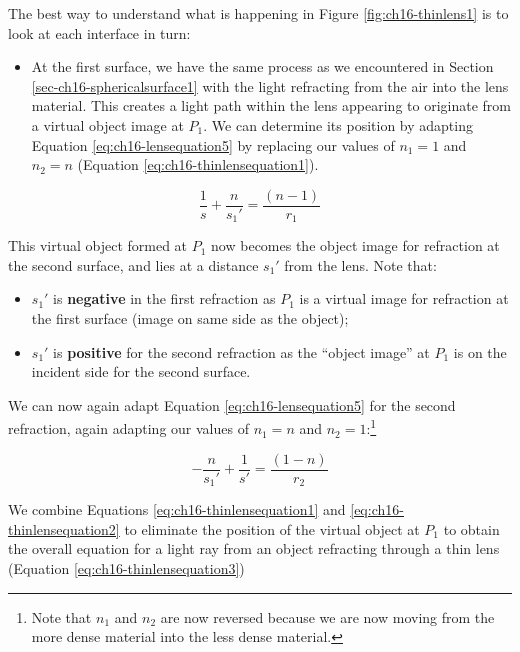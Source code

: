 \documentclass[
]{book}
\providecommand{\tightlist}{%
  \setlength{\itemsep}{0pt}\setlength{\parskip}{0pt}}
\begin{document}
The best way to understand what is happening in Figure \ref{fig:ch16-thinlens1} is to look at each interface in turn:

\begin{itemize}
\tightlist
\item
  At the first surface, we have the same process as we encountered in Section \ref{sec-ch16-sphericalsurface1} with the light refracting from the air into the lens material. This creates a light path within the lens appearing to originate from a virtual object image at \(P_1\). We can determine its position by adapting Equation \eqref{eq:ch16-lensequation5} by replacing our values of \(n_1 = 1\) and \(n_2 = n\) (Equation \eqref{eq:ch16-thinlensequation1}).
\end{itemize}

\begin{equation}
\frac{1}{s} + \frac{n}{s_1'} = \frac{(n - 1)}{r_1}
\label{eq:ch16-thinlensequation1}
\end{equation}

This virtual object formed at \(P_1\) now becomes the object image for refraction at the second surface, and lies at a distance \(s_1'\) from the lens. Note that:

\begin{itemize}
\tightlist
\item
  \(s_1'\) is \textbf{negative} in the first refraction as \(P_1\) is a virtual image for refraction at the first surface (image on same side as the object);
\item
  \(s_1'\) is \textbf{positive} for the second refraction as the ``object image'' at \(P_1\) is on the incident side for the second surface.
\end{itemize}

We can now again adapt Equation \eqref{eq:ch16-lensequation5} for the second refraction, again adapting our values of \(n_1 = n\) and \(n_2 = 1\):\footnote{Note that \(n_1\) and \(n_2\) are now reversed because we are now moving from the more dense material into the less dense material.}

\begin{equation}
-\frac{n}{s_1'} + \frac{1}{s'} = \frac{(1 - n)}{r_2}
\label{eq:ch16-thinlensequation2}
\end{equation}

We combine Equations \eqref{eq:ch16-thinlensequation1} and \eqref{eq:ch16-thinlensequation2} to eliminate the position of the virtual object at \(P_1\) to obtain the overall equation for a light ray from an object refracting through a thin lens (Equation \eqref{eq:ch16-thinlensequation3})
\end{document}
